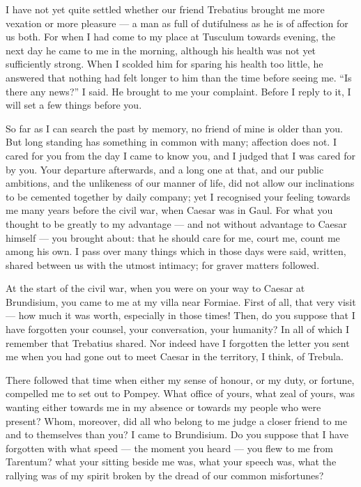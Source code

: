 

 I have not yet quite settled whether our friend Trebatius brought me more vexation or more pleasure --- a man as full of dutifulness as he is of affection for us both. For when I had come to my place at Tusculum towards evening, the next day he came to me in the morning, although his health was not yet sufficiently strong. When I scolded him for sparing his health too little, he answered that nothing had felt longer to him than the time before seeing me. ``Is there any news?'' I said. He brought to me your complaint. Before I reply to it, I will set a few things before you.

 So far as I can search the past by memory, no friend of mine is older than you. But long standing has something in common with many; affection does not. I cared for you from the day I came to know you, and I judged that I was cared for by you. Your departure afterwards, and a long one at that, and our public ambitions, and the unlikeness of our manner of life, did not allow our inclinations to be cemented together by daily company; yet I recognised your feeling towards me many years before the civil war, when Caesar was in Gaul. For what you thought to be greatly to my advantage --- and not without advantage to Caesar himself --- you brought about: that he should care for me, court me, count me among his own. I pass over many things which in those days were said, written, shared between us with the utmost intimacy; for graver matters followed.

 At the start of the civil war, when you were on your way to Caesar at Brundisium, you came to me at my villa near Formiae. First of all, that very visit --- how much it was worth, especially in those times! Then, do you suppose that I have forgotten your counsel, your conversation, your humanity? In all of which I remember that Trebatius shared. Nor indeed have I forgotten the letter you sent me when you had gone out to meet Caesar in the territory, I think, of Trebula.

 There followed that time when either my sense of honour, or my duty, or fortune, compelled me to set out to Pompey. What office of yours, what zeal of yours, was wanting either towards me in my absence or towards my people who were present? Whom, moreover, did all who belong to me judge a closer friend to me and to themselves than you? I came to Brundisium. Do you suppose that I have forgotten with what speed --- the moment you heard --- you flew to me from Tarentum? what your sitting beside me was, what your speech was, what the rallying was of my spirit broken by the dread of our common misfortunes?

